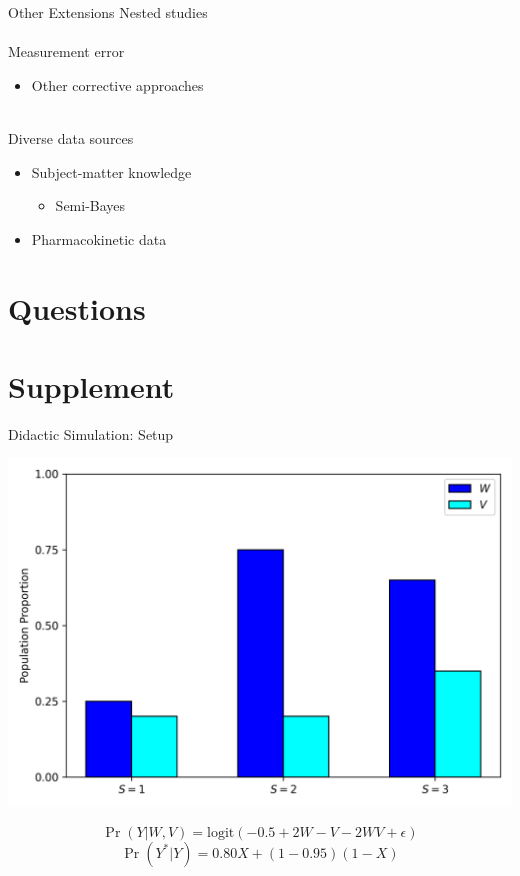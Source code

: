 \documentclass{beamer}
\begin{document}
\begin{frame}{Other Extensions}
	Nested studies\\~\\
	Measurement error
	\begin{itemize}
		\item Other corrective approaches
	\end{itemize}~\\
	Diverse data sources
	\begin{itemize}
		\item Subject-matter knowledge
		\begin{itemize}
			\item Semi-Bayes
		\end{itemize}
		\item Pharmacokinetic data
	\end{itemize}
\end{frame}

\section{Questions}

\section{Supplement}

\begin{frame}{Didactic Simulation: Setup}
	\begin{center}
		\includegraphics[scale=0.4]{code/figure_didactic_popprops.png}	
	\end{center}
	\[\Pr(Y | W,V) = \text{logit}(-0.5 + 2W - V - 2WV + \epsilon)\]
	\[\Pr(Y^* | Y) = 0.80 X + (1-0.95)(1-X)\]
\end{frame}
\end{document}
